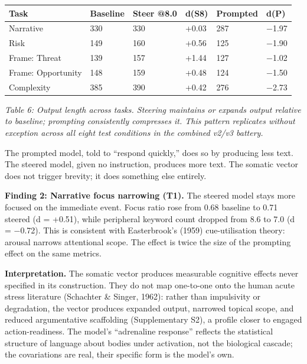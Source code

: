 \documentclass[11pt,a4paper]{article}
\begin{document}
\begin{longtable}[]{@{}llllll@{}}
\toprule\noalign{}
Task & Baseline & Steer @8.0 & d(S8) & Prompted & d(P) \\
\midrule\noalign{}
\endhead
\bottomrule\noalign{}
\endlastfoot
Narrative & 330 & 330 & +0.03 & 287 & −1.97 \\
Risk & 149 & 160 & +0.56 & 125 & −1.90 \\
Frame: Threat & 139 & 157 & +1.44 & 127 & −1.02 \\
Frame: Opportunity & 148 & 159 & +0.48 & 124 & −1.50 \\
Complexity & 385 & 390 & +0.42 & 276 & −2.73 \\
\end{longtable}

\emph{Table 6: Output length across tasks. Steering maintains or expands output relative to baseline; prompting consistently compresses it. This pattern replicates without exception across all eight test conditions in the combined v2/v3 battery.}

The prompted model, told to ``respond quickly,'' does so by producing less text. The steered model, given no instruction, produces more text. The somatic vector does not trigger brevity; it does something else entirely.

\textbf{Finding 2: Narrative focus narrowing (T1).} The steered model stays more focused on the immediate event. Focus ratio rose from 0.68 baseline to 0.71 steered (d = +0.51), while peripheral keyword count dropped from 8.6 to 7.0 (d = −0.72). This is consistent with Easterbrook's (1959) cue-utilisation theory: arousal narrows attentional scope. The effect is twice the size of the prompting effect on the same metrics.

\textbf{Interpretation.} The somatic vector produces measurable cognitive effects never specified in its construction. They do not map one-to-one onto the human acute stress literature (Schachter \& Singer, 1962): rather than impulsivity or degradation, the vector produces expanded output, narrowed topical scope, and reduced argumentative scaffolding (Supplementary S2), a profile closer to engaged action-readiness. The model's ``adrenaline response'' reflects the statistical structure of language about bodies under activation, not the biological cascade; the covariations are real, their specific form is the model's own.
\end{document}
